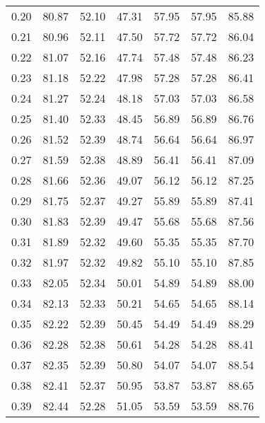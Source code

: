 \begin{tabular}{|c|c|c|c|c|c|c|}
      0.20 &     80.87 &     52.10 &      47.31 &   57.95 &      57.95 &         85.88 \\
      0.21 &     80.96 &     52.11 &      47.50 &   57.72 &      57.72 &         86.04 \\
      0.22 &     81.07 &     52.16 &      47.74 &   57.48 &      57.48 &         86.23 \\
      0.23 &     81.18 &     52.22 &      47.98 &   57.28 &      57.28 &         86.41 \\
      0.24 &     81.27 &     52.24 &      48.18 &   57.03 &      57.03 &         86.58 \\
      0.25 &     81.40 &     52.33 &      48.45 &   56.89 &      56.89 &         86.76 \\
      0.26 &     81.52 &     52.39 &      48.74 &   56.64 &      56.64 &         86.97 \\
      0.27 &     81.59 &     52.38 &      48.89 &   56.41 &      56.41 &         87.09 \\
      0.28 &     81.66 &     52.36 &      49.07 &   56.12 &      56.12 &         87.25 \\
      0.29 &     81.75 &     52.37 &      49.27 &   55.89 &      55.89 &         87.41 \\
      0.30 &     81.83 &     52.39 &      49.47 &   55.68 &      55.68 &         87.56 \\
      0.31 &     81.89 &     52.32 &      49.60 &   55.35 &      55.35 &         87.70 \\
      0.32 &     81.97 &     52.32 &      49.82 &   55.10 &      55.10 &         87.85 \\
      0.33 &     82.05 &     52.34 &      50.01 &   54.89 &      54.89 &         88.00 \\
      0.34 &     82.13 &     52.33 &      50.21 &   54.65 &      54.65 &         88.14 \\
      0.35 &     82.22 &     52.39 &      50.45 &   54.49 &      54.49 &         88.29 \\
      0.36 &     82.28 &     52.38 &      50.61 &   54.28 &      54.28 &         88.41 \\
      0.37 &     82.35 &     52.39 &      50.80 &   54.07 &      54.07 &         88.54 \\
      0.38 &     82.41 &     52.37 &      50.95 &   53.87 &      53.87 &         88.65 \\
      0.39 &     82.44 &     52.28 &      51.05 &   53.59 &      53.59 &         88.76 \\

\end{tabular}
